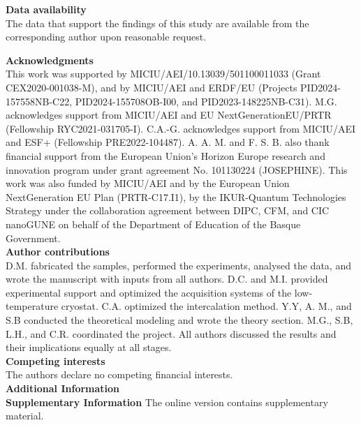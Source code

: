 \documentclass[twocolumn,secnumarabic,amssymb, nobibnotes, aps, prl, superscriptaddress]{revtex4-2}
\begin{document}
\noindent\large{\textbf{Data availability}}\normalsize\\
\noindent The data that support the findings of this study are available
from the corresponding author upon reasonable request.




\vspace{1cm}

\noindent\large{\textbf{Acknowledgments}}\normalsize\\
\noindent This work was supported by MICIU/AEI/10.13039/501100011033 (Grant CEX2020-001038-M), and by MICIU/AEI and ERDF/EU (Projects PID2024-157558NB-C22, PID2024-155708OB-I00, and PID2023-148225NB-C31). M.G. acknowledges support from MICIU/AEI and EU NextGenerationEU/PRTR (Fellowship RYC2021-031705-I). C.A.-G. acknowledges support from MICIU/AEI and ESF+ (Fellowship PRE2022-104487). A. A. M. and F. S. B. also thank financial support from the
European Union’s Horizon Europe research and innovation program under grant agreement No. 101130224 (JOSEPHINE). 
This work was also funded by MICIU/AEI and by the European Union NextGeneration EU Plan (PRTR-C17.I1), by the IKUR-Quantum Technologies Strategy under the collaboration agreement between DIPC, CFM, and CIC nanoGUNE on behalf of the Department of Education of the Basque Government.\\

\noindent \large{\textbf{Author contributions}}\normalsize\\
\noindent D.M. fabricated the samples, performed the experiments, analysed the data, and wrote the manuscript with inputs from all authors. D.C. and M.I. provided experimental support and optimized the acquisition systems of the low-temperature cryostat. C.A. optimized the intercalation method.  Y.Y, A. M., and S.B  conducted the theoretical modeling and wrote the theory section. M.G., S.B, L.H., and C.R. coordinated the project. All authors discussed the results and their implications equally at all stages.\\



\noindent\large{\textbf{Competing interests}}\normalsize\\
\noindent The authors declare no competing financial interests.\\

\noindent\large{\textbf{Additional Information}}\normalsize\\
\noindent 
\textbf{Supplementary Information} The online version contains supplementary material. \\
\end{document}

